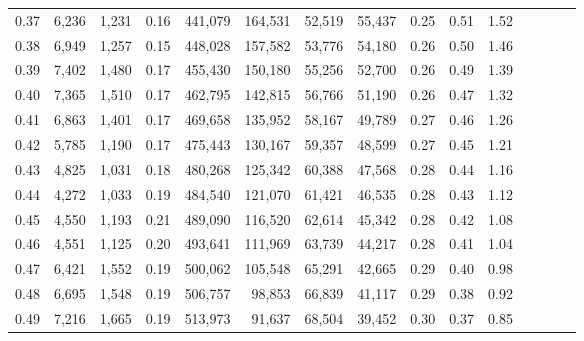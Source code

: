 \begin{tabular}{rrrcrrrrrrrrrrr}
0.37 &   6,236 &  1,231 &                                       0.16 &  441,079 &  164,531 &   52,519 &   55,437 &  0.25 &  0.51 &                         1.52 \\
0.38 &   6,949 &  1,257 &                                       0.15 &  448,028 &  157,582 &   53,776 &   54,180 &  0.26 &  0.50 &                         1.46 \\
0.39 &   7,402 &  1,480 &                                       0.17 &  455,430 &  150,180 &   55,256 &   52,700 &  0.26 &  0.49 &                         1.39 \\
0.40 &   7,365 &  1,510 &                                       0.17 &  462,795 &  142,815 &   56,766 &   51,190 &  0.26 &  0.47 &                         1.32 \\
0.41 &   6,863 &  1,401 &                                       0.17 &  469,658 &  135,952 &   58,167 &   49,789 &  0.27 &  0.46 &                         1.26 \\
0.42 &   5,785 &  1,190 &                                       0.17 &  475,443 &  130,167 &   59,357 &   48,599 &  0.27 &  0.45 &                         1.21 \\
0.43 &   4,825 &  1,031 &                                       0.18 &  480,268 &  125,342 &   60,388 &   47,568 &  0.28 &  0.44 &                         1.16 \\
0.44 &   4,272 &  1,033 &                                       0.19 &  484,540 &  121,070 &   61,421 &   46,535 &  0.28 &  0.43 &                         1.12 \\
0.45 &   4,550 &  1,193 &                                       0.21 &  489,090 &  116,520 &   62,614 &   45,342 &  0.28 &  0.42 &                         1.08 \\
0.46 &   4,551 &  1,125 &                                       0.20 &  493,641 &  111,969 &   63,739 &   44,217 &  0.28 &  0.41 &                         1.04 \\
0.47 &   6,421 &  1,552 &                                       0.19 &  500,062 &  105,548 &   65,291 &   42,665 &  0.29 &  0.40 &                         0.98 \\
0.48 &   6,695 &  1,548 &                                       0.19 &  506,757 &   98,853 &   66,839 &   41,117 &  0.29 &  0.38 &                         0.92 \\
0.49 &   7,216 &  1,665 &                                       0.19 &  513,973 &   91,637 &   68,504 &   39,452 &  0.30 &  0.37 &                         0.85 \\

\end{tabular}

